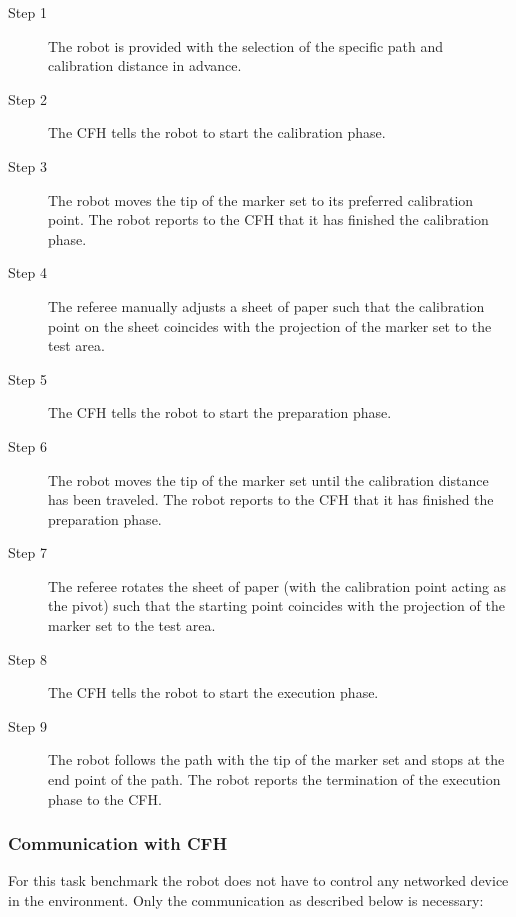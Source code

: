 \begin{description}
\item[Step 1] The robot is provided with the selection of the specific path and calibration distance in advance.
\item[Step 2] The CFH tells the robot to start the calibration phase.
\item[Step 3] The robot moves the tip of the marker set to its preferred calibration point. The robot reports to the CFH that it has finished the calibration phase.
\item[Step 4] The referee manually adjusts a sheet of paper such that the calibration point on the sheet coincides with the projection of the marker set to the test area.
\item[Step 5] The CFH tells the robot to start the preparation phase.
\item[Step 6] The robot moves the tip of the marker set until the calibration distance has been traveled. The robot reports to the CFH that it has finished the preparation phase.
\item[Step 7] The referee rotates the sheet of paper (with the calibration point acting as the pivot) such that the starting point coincides with the projection of the marker set to the test area.
\item[Step 8] The CFH tells the robot to start the execution phase.
\item[Step 9] The robot follows the path with the tip of the marker set and stops at the end point of the path. The robot reports the termination of the execution phase to the CFH.
\end{description} 

\subsubsection{Communication with CFH}
\label{sssec:CommCFHControl}

For this task benchmark the robot does not have to control any networked device in the environment. Only the communication as described below is necessary:

